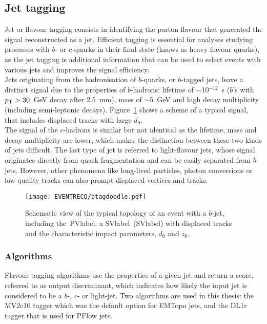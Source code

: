\subsection{Jet tagging}

Jet or flavour tagging consists in identifying the parton flavour that generated the signal reconstructed as a jet. Efficient tagging is essential for analyses studying processes with $b$- or $c$-quarks in their final state (knows as heavy flavour quarks), as the jet tagging is additional information that can be used to select events with various jets and improves the signal efficiency.\\

Jets originating from the hadronisation of $b$-quarks, or $b$-tagged jets, leave a distinct signal due to the properties of $b$-hadrons: lifetime of $\sim$10$^{-12}$~s ($b$'s with $p_{\text{T}}>30$~GeV decay after 2.5~mm), mass of $\sim$5~GeV and high decay multiplicity (including semi-leptonic decays). Figure~\ref{figEVNTRECO:BTAGTOPO} shows a scheme of a typical signal, that includes displaced tracks with large $d_0$.\\

The signal of the $c$-hadrons is similar but not identical as the lifetime, mass and decay multiplicity are lower, which makes the distinction between these two kinds of jets difficult. The last type of jet is referred to light-flavour jets, whose signal originates directly from quark fragmentation and can be easily separated from $b$-jets. However, other phenomena like long-lived particles, photon conversions or low quality tracks can also prompt displaced vertices and tracks.

\begin{figure}[htbp]
    \RawFloats
    \begin{center}
    \texttt{[image: EVENTRECO/btagdoodle.pdf]}
    \caption{
        Schematic view of the typical topology of an event with a $b$-jet, including the~\acrshort{PVlabel}, a \acrlong{SVlabel}~(\acrshort{SVlabel}) with displaced tracks and the characteristic impact parameters, $d_0$ and $z_0$.
    }
    \label{figEVNTRECO:BTAGTOPO}
    \end{center}
\end{figure}

\subsubsection{Algorithms}

Flavour tagging algorithms use the properties of a given jet and return a score, referred to as output discriminant, which indicates how likely the input jet is considered to be a $b$-, $c$- or light-jet. Two algorithms are used in this thesis: the MV2c10 tagger which was the default option for EMTopo jets, and the DL1r tagger that is used for PFlow jets.\\

